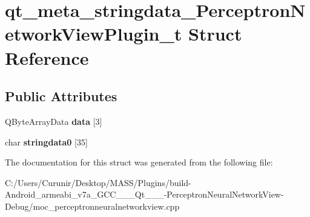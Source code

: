 \hypertarget{structqt__meta__stringdata___perceptron_network_view_plugin__t}{}\section{qt\+\_\+meta\+\_\+stringdata\+\_\+\+Perceptron\+Network\+View\+Plugin\+\_\+t Struct Reference}
\label{structqt__meta__stringdata___perceptron_network_view_plugin__t}
\subsection*{Public Attributes}
\begin{DoxyCompactItemize}
\item 
\mbox{\label{structqt__meta__stringdata___perceptron_network_view_plugin__t_a6ec16e2d920f78394017e270fceb63f7}} 
Q\+Byte\+Array\+Data {\bfseries data} \mbox{[}3\mbox{]}
\item 
\mbox{\label{structqt__meta__stringdata___perceptron_network_view_plugin__t_a4a6536d9a7a3fb15361ccde8aa7c0a39}} 
char {\bfseries stringdata0} \mbox{[}35\mbox{]}
\end{DoxyCompactItemize}


The documentation for this struct was generated from the following file\+:\begin{DoxyCompactItemize}
\item 
C\+:/\+Users/\+Curunir/\+Desktop/\+M\+A\+S\+S/\+Plugins/build-\/\+Android\+\_\+armeabi\+\_\+v7a\+\_\+\+G\+C\+C\+\_\+\_\+\_\+\+Qt\+\_\+\_\+\_-\/\+Perceptron\+Neural\+Network\+View-\/\+Debug/moc\+\_\+perceptronneuralnetworkview.\+cpp\end{DoxyCompactItemize}
